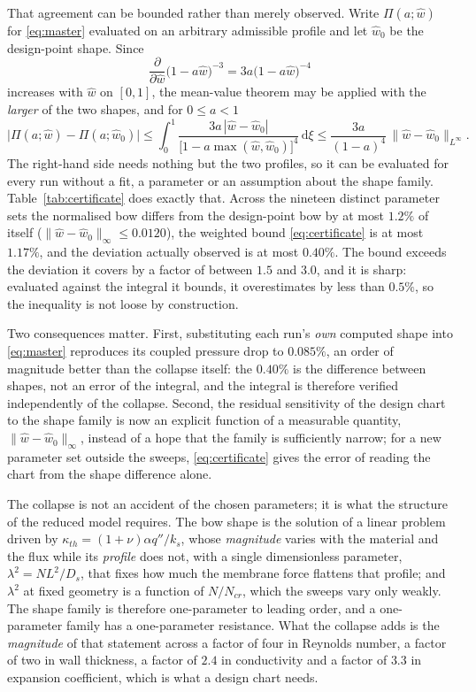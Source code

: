 \documentclass[11pt,a4paper]{article}
\newcommand{\dd}{\mathrm{d}}
\begin{document}
That agreement can be bounded rather than merely observed. Write $\Pi(a;\hat w)$ for
\eqref{eq:master} evaluated on an arbitrary admissible profile and let $\hat w_0$ be the
design-point shape. Since
\begin{equation}
\frac{\partial}{\partial\hat w}\bigl(1-a\hat w\bigr)^{-3}=3a\bigl(1-a\hat w\bigr)^{-4}
\label{eq:certderiv}
\end{equation}
increases with $\hat w$ on $[0,1]$, the mean-value theorem may be applied with the \emph{larger} of
the two shapes, and for $0\le a<1$
\begin{equation}
\bigl|\Pi(a;\hat w)-\Pi(a;\hat w_0)\bigr|
\le\int_0^1\frac{3a\,|\hat w-\hat w_0|}
{\bigl[1-a\max(\hat w,\hat w_0)\bigr]^{4}}\,\dd\xi
\le\frac{3a}{(1-a)^4}\,\|\hat w-\hat w_0\|_{L^\infty}.
\label{eq:certificate}
\end{equation}
The right-hand side needs nothing but the two profiles, so it can be evaluated for every run
without a fit, a parameter or an assumption about the shape family.
Table~\ref{tab:certificate} does exactly that. Across the nineteen distinct parameter sets
the normalised bow differs from the design-point bow by at most $1.2\%$ of itself
($\|\hat w-\hat w_0\|_\infty\le0.0120$), the weighted bound \eqref{eq:certificate} is at most
$1.17\%$, and the deviation actually observed is at most $0.40\%$. The bound exceeds the deviation
it covers by a factor of between $1.5$ and $3.0$, and it is sharp: evaluated against the integral it
bounds, it overestimates by less than $0.5\%$, so the inequality is not loose by construction.

Two consequences matter. First, substituting each run's \emph{own} computed shape into
\eqref{eq:master} reproduces its coupled pressure drop to $0.085\%$, an order of magnitude
better than the collapse itself: the $0.40\%$ is the difference between shapes, not an error of
the integral, and the integral is therefore verified independently of the collapse. Second, the
residual sensitivity of the design chart to the shape family is now an explicit function of a
measurable quantity, $\|\hat w-\hat w_0\|_\infty$, instead of a hope that the family is
sufficiently narrow; for a new parameter set outside the sweeps, \eqref{eq:certificate} gives the
error of reading the chart from the shape difference alone.

The collapse is not an accident of the chosen parameters; it is what the structure of the
reduced model requires. The bow shape is the solution of a linear problem driven by
$\kappa_{th}=(1+\nu)\alpha q''/k_s$, whose \emph{magnitude} varies with the material and the
flux while its \emph{profile} does not, with a single dimensionless parameter,
$\lambda^2=N L^2/D_s$, that fixes how much the membrane force flattens that profile; and $\lambda^2$ at fixed geometry is a function of $N/N_{cr}$, which the sweeps
vary only weakly. The shape family is therefore one-parameter to leading order, and a
one-parameter family has a one-parameter resistance. What the collapse adds is the
\emph{magnitude} of that statement across a factor of four in Reynolds number, a factor of two
in wall thickness, a factor of $2.4$ in conductivity and a factor of $3.3$ in expansion
coefficient, which is what a design chart needs.
\end{document}
